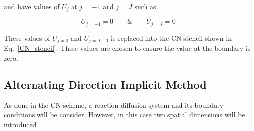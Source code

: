 and have values of $U_{j}$ at $j=-1$ and $j=J$ such as

\begin{equation}
    U_{j=-1} = 0  \quad \quad \&  \quad \quad  U_{j=J} = 0
\end{equation}

These values of $U_{j=0}$ and  $U_{j=J-1}$ is replaced into the CN stencil shown in Eq.~\ref{CN_stencil}.
These values are chosen to ensure the value at the boundary is zero.



\subsection{Alternating Direction Implicit Method}\label{ADI}
As done in the \acrshort{CN} scheme, a reaction diffusion system and its boundary conditions will be consider. However, in this case two spatial dimensions will be introduced.

